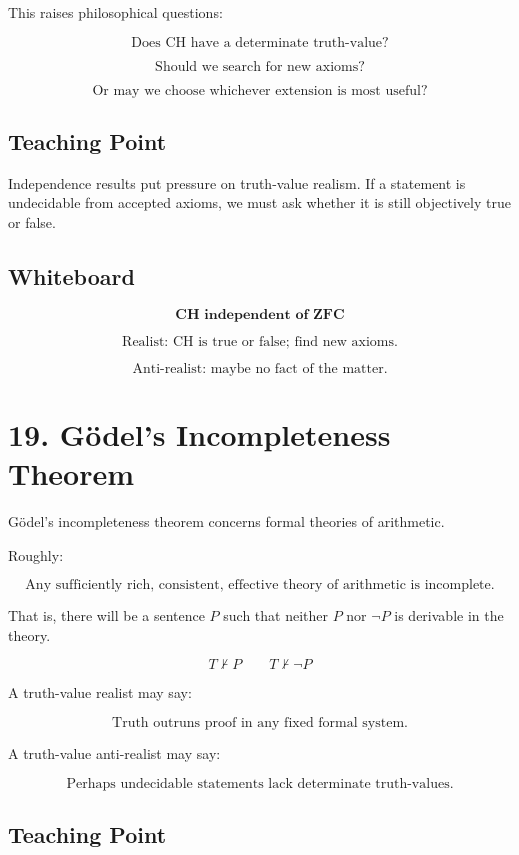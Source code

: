 \documentclass[11pt]{article}
\begin{document}
This raises philosophical questions:

\[
\text{Does CH have a determinate truth-value?}
\]

\[
\text{Should we search for new axioms?}
\]

\[
\text{Or may we choose whichever extension is most useful?}
\]

\subsection*{Teaching Point}

Independence results put pressure on truth-value realism. If a statement is undecidable
from accepted axioms, we must ask whether it is still objectively true or false.

\subsection*{Whiteboard}

\[
\textbf{CH independent of ZFC}
\]

\[
\text{Realist: CH is true or false; find new axioms.}
\]

\[
\text{Anti-realist: maybe no fact of the matter.}
\]

\section*{19. G\"odel's Incompleteness Theorem}

G\"odel's incompleteness theorem concerns formal theories of arithmetic.

Roughly:

\[
\text{Any sufficiently rich, consistent, effective theory of arithmetic is incomplete.}
\]

That is, there will be a sentence \(P\) such that neither \(P\) nor \(\neg P\) is derivable in
the theory.

\[
T \nvdash P
\qquad
T \nvdash \neg P
\]

A truth-value realist may say:

\[
\text{Truth outruns proof in any fixed formal system.}
\]

A truth-value anti-realist may say:

\[
\text{Perhaps undecidable statements lack determinate truth-values.}
\]

\subsection*{Teaching Point}
\end{document}
